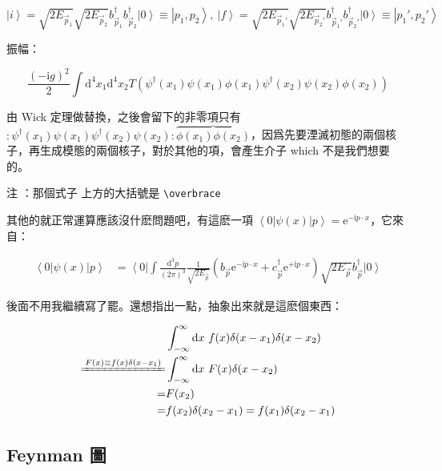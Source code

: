 \documentclass{article}
\begin{document}
$$
\left|i\right\rangle=\sqrt{2E_{\vec{p}_1}}\sqrt{2E_{\vec{p}_2}}b_{\vec{p}_1}^{\dagger}b_{\vec{p}_2}^{\dagger}\left|0\right\rangle\equiv\left|p_1,p_2\right\rangle,\ \left|f\right\rangle=\sqrt{2E_{\vec{p}_1'}}\sqrt{2E_{\vec{p}_2'}}b_{\vec{p}_1'}^{\dagger}b_{\vec{p}_2'}^{\dagger}\left|0\right\rangle\equiv\left|p_1',p_2'\right\rangle
$$

振幅：

$$
\frac{(-\mathrm{i}g)^2}{2}\int\mathrm{d}^4x_1\mathrm{d}^4x_2T\left(\psi^{\dagger}(x_1)\psi(x_1)\phi(x_1)\psi^{\dagger}(x_2)\psi(x_2)\phi(x_2)\right)
$$

由 Wick 定理做替換，之後會留下的非零項只有 $:\psi^{\dagger}(x_1)\psi(x_1)\psi^{\dagger}(x_2)\psi(x_2):\overbrace{\phi(x_1)\phi(x_2)}$，因爲先要湮滅初態的兩個核子，再生成模態的兩個核子，對於其他的項，會產生介子 which 不是我們想要的。

注 ：那個式子  上方的大括號是 \texttt{\textbackslash overbrace{}}

其他的就正常運算應該沒什麽問題吧，有這麽一項 $\left\langle0\right|\psi(x)\left|p\right\rangle=\mathrm{e}^{-\mathrm{i}p\cdot x}$，它來自：

$$
\begin{aligned}
\left\langle0\right|\psi(x)\left|p\right\rangle & = \left\langle0\right|\int\frac{\mathrm{d}^3p}{(2\pi)^3}\frac{1}{\sqrt{2E_{\vec{p}}}}\left(b_{\vec{p}}\mathrm{e}^{-\mathrm{i}p\cdot x}+c_{\vec{p}}^{\dagger}\mathrm{e}^{+\mathrm{i}p\cdot x}\right)\sqrt{2E_{\vec{p}}}b_{\vec{p}}^{\dagger}\left|0\right\rangle
\end{aligned}
$$

後面不用我繼續寫了罷。還想指出一點，抽象出來就是這麽個東西：

$$
\begin{aligned}
& \int_{-\infty}^{\infty}\mathrm{d}x\ f(x)\delta(x-x_1)\delta(x-x_2) \\
\xlongequal{F(x)\equiv f(x)\delta(x-x_1)} & \int_{-\infty}^{\infty}\mathrm{d}x\ F(x)\delta(x-x_2)              \\
=                                         & F(x_2)                                                             \\
=                                         & f(x_2)\delta(x_2-x_1)=f(x_1)\delta(x_2-x_1)
\end{aligned}
$$

\subsection{Feynman 圖}
\end{document}
